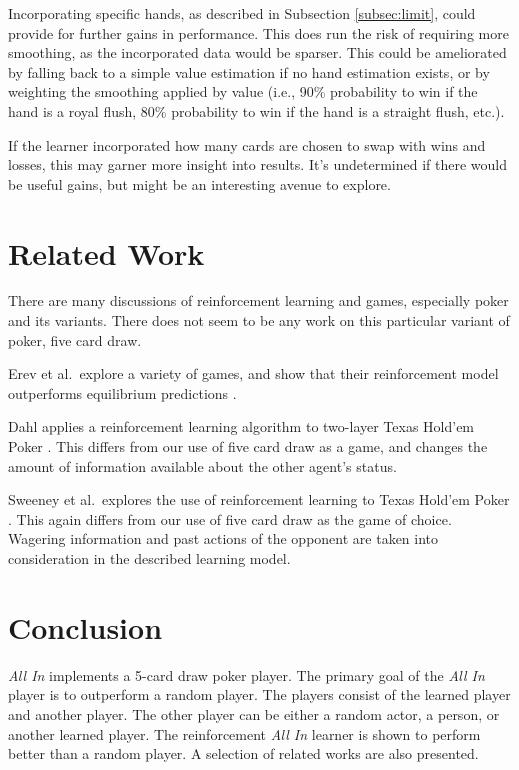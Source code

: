 \documentclass[12pt,pdftex]{article}
\begin{document}
Incorporating specific hands, as described in Subsection \ref{subsec:limit}, could provide for further gains in performance.
This does run the risk of requiring more smoothing, as the incorporated data would be sparser.
This could be ameliorated by falling back to a simple value estimation if no hand estimation exists, or by weighting the smoothing applied by value (i.e., 90\% probability to win if the hand is a royal flush, 80\% probability to win if the hand is a straight flush, etc.).

If the learner incorporated how many cards are chosen to swap with wins and losses, this may garner more insight into results.
It's undetermined if there would be useful gains, but might be an interesting avenue to explore.

\section{Related Work} \label{sec:related}
There are many discussions of reinforcement learning and games, especially poker and its variants.
There does not seem to be any work on this particular variant of poker, five card draw.  

Erev et al.\ explore a variety of games, and show that their reinforcement model outperforms equilibrium predictions \cite{Erev98}.  

Dahl applies a reinforcement learning algorithm to two-layer Texas Hold'em Poker \cite{Dahl01}. 
This differs from our use of five card draw as a game, and changes the amount of information available about the other agent's status. 

Sweeney et al.\ explores the use of reinforcement learning to Texas Hold'em Poker \cite{Sweeney}.
This again differs from our use of five card draw as the game of choice.  
Wagering information and past actions of the opponent are taken into consideration in the described learning model.

\section{Conclusion} \label{sec:conclusion}
\emph{All In} implements a 5-card draw poker player. 
The primary goal of the \emph{All In} player is to outperform a random player. 
The players consist of the learned player and another player. 
The other player can be either a random actor, a person, or another learned player. 
The reinforcement \emph{All In} learner is shown to perform better than a random player.
A selection of related works are also presented.
\end{document}
